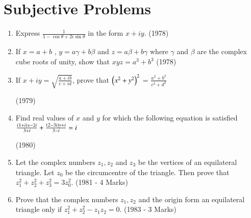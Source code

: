 \documentclass[journal,12pt,twocolumn]{IEEEtran}
\theoremstyle{remark}
\begin{document}
    \section{Subjective Problems}
    \begin{enumerate}
    \item Express $\frac{1}{1-\cos\theta+2i\sin\theta}$ in the form $x+iy$.
    \hfill (1978)
    \item If $x=a+b$ , $y=a\gamma+b\beta$ and $z=a\beta+b\gamma$ where $\gamma$ and $\beta$ are the complex cube roots of unity, show that $xyz=a^3+b^3$ \hfill (1978)
    \item If $x+iy=\sqrt{\frac{a + ib}{c + id}}$, prove that $\left(x^2+y^2\right)^2$ = $\frac{a^2+b^2}{c^2+d^2}$
 
    \hfill (1979)
    \item Find real values of $x$ and $y$ for which the following equation is satisfied $\frac{\left(1+i\right)x-2i}{3+i}+\frac{\left(2-3i\right)y+i}{3-i}=i$

    \hfill (1980)
    \item Let the complex numbers $z_1,z_2$ and $z_3$ be the vertices of an equilateral triangle. Let $z_0$ be the circumcentre of the triangle. Then prove that $z_1^2+z_2^2+z_3^2=3z_0^2$. \hfill (1981 - 4 Marks)
    \item Prove that the complex numbers $z_1,z_2$ and the origin form an equilateral triangle only if $z_1^2+z_2^2-z_1z_2=0$. \hfill (1983 - 3 Marks)
    \end{enumerate} 
    
\end{document}
